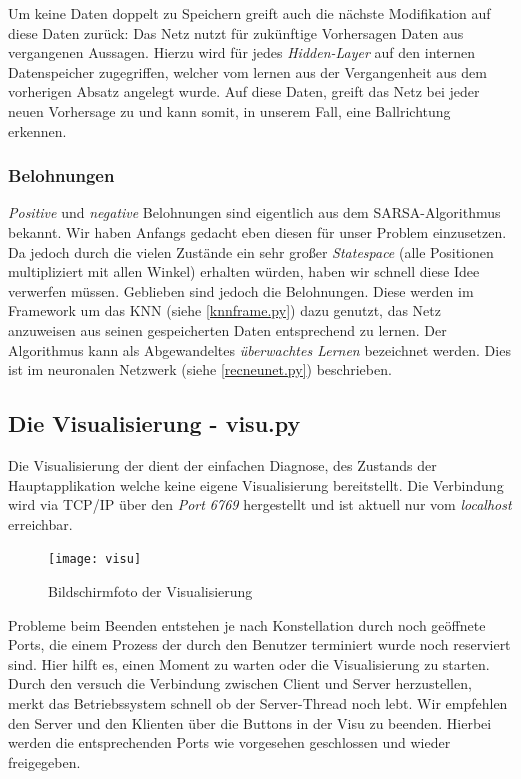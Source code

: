 \documentclass[12pt,twoside]{article}
\theoremstyle{plain}
\theoremstyle{definition}
\theoremstyle{remark}
\begin{document}
Um keine Daten doppelt zu Speichern greift auch die nächste Modifikation auf diese Daten zurück: Das Netz nutzt für zukünftige Vorhersagen Daten aus vergangenen Aussagen. Hierzu wird für jedes \textit{Hidden-Layer} auf den internen Datenspeicher zugegriffen, welcher vom lernen aus der Vergangenheit aus dem vorherigen Absatz angelegt wurde. Auf diese Daten, greift das Netz bei jeder neuen Vorhersage zu und kann somit, in unserem Fall, eine Ballrichtung erkennen. 


\subsubsection{Belohnungen}
\label{rewards}

\textit{Positive} und \textit{negative} Belohnungen sind eigentlich aus dem SARSA-Algorithmus bekannt. Wir haben Anfangs gedacht eben diesen für unser Problem einzusetzen. Da jedoch durch die vielen Zustände ein sehr großer \textit{Statespace} (alle Positionen multipliziert mit allen Winkel) erhalten würden, haben wir schnell diese Idee verwerfen müssen. Geblieben sind jedoch die Belohnungen. Diese werden im Framework um das KNN (siehe \ref{knnframe.py}) dazu genutzt, das Netz anzuweisen aus seinen gespeicherten Daten entsprechend zu lernen. Der Algorithmus kann als Abgewandeltes \textit{überwachtes Lernen} bezeichnet werden. Dies ist im neuronalen Netzwerk (siehe \ref{recneunet.py}) beschrieben.


\subsection{Die Visualisierung - visu.py}
\label{visu.py}

Die Visualisierung der dient der einfachen Diagnose, des Zustands der Hauptapplikation welche keine eigene Visualisierung bereitstellt. Die Verbindung wird via TCP/IP über den \textit{Port 6769} hergestellt und ist aktuell nur vom \textit{localhost} erreichbar.

\begin{figure}[hbtp]
	 \centerline{\texttt{[image: visu]}}
	 {\caption{Bildschirmfoto der Visualisierung}\label{fig:visu}}
\end{figure}

Probleme beim Beenden entstehen je nach Konstellation durch noch geöffnete Ports, die einem Prozess der durch den Benutzer terminiert wurde noch reserviert sind. Hier hilft es, einen Moment zu warten oder die Visualisierung zu starten. Durch den versuch die Verbindung zwischen Client und Server herzustellen, merkt das Betriebssystem schnell ob der Server-Thread noch lebt.
Wir empfehlen den Server und den Klienten über die Buttons in der Visu zu beenden. Hierbei werden die entsprechenden Ports wie vorgesehen geschlossen und wieder freigegeben.
\end{document}

